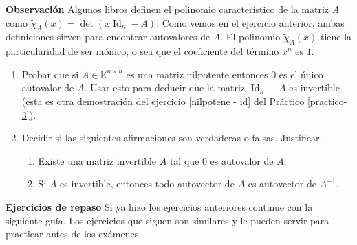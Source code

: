 \textbf{Observación} Algunos libros definen el polinomio característico de la matriz $A$ como $\tilde\chi_A(x)=\det(x\operatorname{Id}_n-A)$. Como vemos en el ejercicio anterior, ambas definiciones sirven para encontrar autovalores de $A$. El polinomio $\tilde\chi_A(x)$ tiene la particularidad de ser mónico, o sea que el coeficiente del término $x^n$ es $1$.

\begin{enumerate}[resume,topsep=6pt,itemsep=.4cm]

\item Probar que si $A\in\mathbb{K}^{n\times n}$ es una matriz nilpotente entonces $0$ es el único autovalor de $A$. Usar esto para deducir que la matriz $\operatorname{Id}_n-A$ es invertible (esta es otra demostración del ejercicio \ref{nilpotene - id} del Práctico \ref{practico-3}).


\item Decidir si las siguientes afirmaciones son verdaderas o falsas. Justificar.

\begin{enumerate}
    \item Existe una matriz invertible $A$ tal que $0$ es autovalor de $A$.
    \item  Si $A$ es invertible, entonces todo autovector de $A$ es autovector de $A^{-1}$.
\end{enumerate}

\end{enumerate}

\textbf{Ejercicios de repaso}
Si ya hizo los ejercicios anteriores continue con la siguiente guía. Los ejercicios que siguen son similares y le pueden servir para practicar antes de los exámenes.

